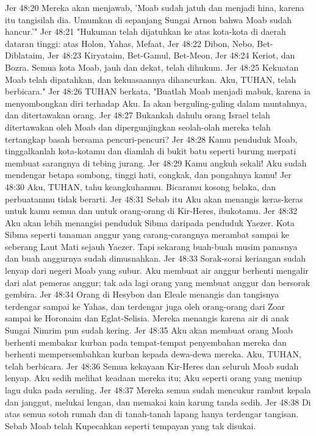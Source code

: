 Jer 48:20  Mereka akan menjawab, 'Moab sudah jatuh dan menjadi hina, karena itu tangisilah dia. Umumkan di sepanjang Sungai Arnon bahwa Moab sudah hancur.'"
Jer 48:21  "Hukuman telah dijatuhkan ke atas kota-kota di daerah dataran tinggi: atas Holon, Yahas, Mefaat,
Jer 48:22  Dibon, Nebo, Bet-Diblataim,
Jer 48:23  Kiryataim, Bet-Gamul, Bet-Meon,
Jer 48:24  Keriot, dan Bozra. Semua kota Moab, jauh dan dekat, telah dihukum.
Jer 48:25  Kekuatan Moab telah dipatahkan, dan kekuasaannya dihancurkan. Aku, TUHAN, telah berbicara."
Jer 48:26  TUHAN berkata, "Buatlah Moab menjadi mabuk, karena ia menyombongkan diri terhadap Aku. Ia akan berguling-guling dalam muntahnya, dan ditertawakan orang.
Jer 48:27  Bukankah dahulu orang Israel telah ditertawakan oleh Moab dan dipergunjingkan seolah-olah mereka telah tertangkap basah bersama pencuri-pencuri?
Jer 48:28  Kamu penduduk Moab, tinggalkanlah kota-kotamu dan diamlah di bukit batu seperti burung merpati membuat sarangnya di tebing jurang.
Jer 48:29  Kamu angkuh sekali! Aku sudah mendengar betapa sombong, tinggi hati, congkak, dan pongahnya kamu!
Jer 48:30  Aku, TUHAN, tahu keangkuhanmu. Bicaramu kosong belaka, dan perbuatanmu tidak berarti.
Jer 48:31  Sebab itu Aku akan menangis keras-keras untuk kamu semua dan untuk orang-orang di Kir-Heres, ibukotamu.
Jer 48:32  Aku akan lebih menangisi penduduk Sibma daripada penduduk Yaezer. Kota Sibma seperti tanaman anggur yang carang-carangnya merambat sampai ke seberang Laut Mati sejauh Yaezer. Tapi sekarang buah-buah musim panasnya dan buah anggurnya sudah dimusnahkan.
Jer 48:33  Sorak-sorai keriangan sudah lenyap dari negeri Moab yang subur. Aku membuat air anggur berhenti mengalir dari alat pemeras anggur; tak ada lagi orang yang membuat anggur dan bersorak gembira.
Jer 48:34  Orang di Hesybon dan Eleale menangis dan tangisnya terdengar sampai ke Yahas, dan terdengar juga oleh orang-orang dari Zoar sampai ke Horonaim dan Eglat-Selisia. Mereka menangis karena air di anak Sungai Nimrim pun sudah kering.
Jer 48:35  Aku akan membuat orang Moab berhenti membakar kurban pada tempat-tempat penyembahan mereka dan berhenti mempersembahkan kurban kepada dewa-dewa mereka. Aku, TUHAN, telah berbicara.
Jer 48:36  Semua kekayaan Kir-Heres dan seluruh Moab sudah lenyap. Aku sedih melihat keadaan mereka itu; Aku seperti orang yang meniup lagu duka pada seruling.
Jer 48:37  Mereka semua sudah mencukur rambut kepala dan janggut, melukai lengan, dan memakai kain karung tanda sedih.
Jer 48:38  Di atas semua sotoh rumah dan di tanah-tanah lapang hanya terdengar tangisan. Sebab Moab telah Kupecahkan seperti tempayan yang tak disukai.
